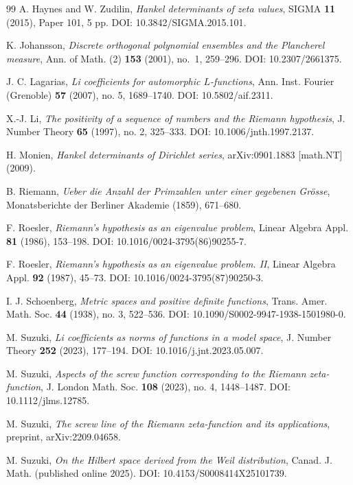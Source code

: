 \documentclass[11pt]{amsart}
\numberwithin{equation}{section}
\theoremstyle{plain}
\theoremstyle{definition}
\theoremstyle{remark}
\begin{document}
\begin{thebibliography}{99}
A. Haynes and W. Zudilin,
\emph{Hankel determinants of zeta values},
SIGMA \textbf{11} (2015), Paper 101, 5 pp.
DOI: 10.3842/SIGMA.2015.101.

K. Johansson,
\emph{Discrete orthogonal polynomial ensembles and the Plancherel measure},
Ann. of Math. (2) \textbf{153} (2001), no.~1, 259--296.
DOI: 10.2307/2661375.

J. C. Lagarias,
\emph{Li coefficients for automorphic $L$-functions},
Ann. Inst. Fourier (Grenoble) \textbf{57} (2007), no. 5, 1689--1740.
DOI: 10.5802/aif.2311.

X.-J. Li,
\emph{The positivity of a sequence of numbers and the Riemann hypothesis},
J. Number Theory \textbf{65} (1997), no. 2, 325--333.
DOI: 10.1006/jnth.1997.2137.

H. Monien,
\emph{Hankel determinants of Dirichlet series},
arXiv:0901.1883 [math.NT] (2009).

B. Riemann,
\emph{Ueber die Anzahl der Primzahlen unter einer gegebenen Gr\"osse},
Monatsberichte der Berliner Akademie (1859), 671--680.

F. Roesler,
\emph{Riemann's hypothesis as an eigenvalue problem},
Linear Algebra Appl. \textbf{81} (1986), 153--198.
DOI: 10.1016/0024-3795(86)90255-7.

F. Roesler,
\emph{Riemann's hypothesis as an eigenvalue problem. II},
Linear Algebra Appl. \textbf{92} (1987), 45--73.
DOI: 10.1016/0024-3795(87)90250-3.

I. J. Schoenberg,
\emph{Metric spaces and positive definite functions},
Trans. Amer. Math. Soc. \textbf{44} (1938), no. 3, 522--536.
DOI: 10.1090/S0002-9947-1938-1501980-0.

M. Suzuki,
\emph{Li coefficients as norms of functions in a model space},
J. Number Theory \textbf{252} (2023), 177--194.
DOI: 10.1016/j.jnt.2023.05.007.

M. Suzuki,
\emph{Aspects of the screw function corresponding to the Riemann zeta-function},
J. London Math. Soc. \textbf{108} (2023), no. 4, 1448--1487.
DOI: 10.1112/jlms.12785.

M. Suzuki,
\emph{The screw line of the Riemann zeta-function and its applications},
preprint, arXiv:2209.04658.

M. Suzuki,
\emph{On the Hilbert space derived from the Weil distribution},
Canad. J. Math. (published online 2025).
DOI: 10.4153/S0008414X25101739.


\end{thebibliography}
\end{document}

